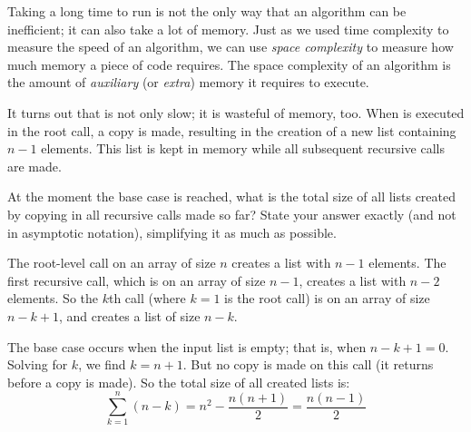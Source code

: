 \begin{prob}
\begin{subprobset}
\begin{subprob}
        \end{subprob}

        \begin{subprob}
            Taking a long time to run is not the only way that an algorithm can be inefficient;
            it can also take a lot of memory. Just as we used time complexity to measure the
            speed of an algorithm, we can use \emph{space complexity} to measure how much
            memory a piece of code requires.
            The space complexity of an algorithm is the amount of
            \emph{auxiliary} (or \emph{extra}) memory it requires to execute.

            It turns out that  is not only slow; it is wasteful
            of memory, too. When  is executed in the root call,
            a copy is made, resulting in the creation of a new list containing $n - 1$
            elements. This list is kept in memory while all subsequent recursive calls are made.

            At the moment the base case is reached, what is the total size of all lists
            created by copying in all recursive calls made so far?
            State your answer exactly (and not in asymptotic notation), simplifying
            it as much as possible.

            \begin{soln}
                The root-level call on an array of size $n$ creates a list with $n - 1$ elements. The first recursive call,
                which is on an array of size $n-1$, creates a list with $n - 2$ elements. So
                the $k$th call (where $k = 1$ is the root call) is on an array of size $n - k +1$, and creates
                a list of size $n - k$.

                The base case occurs when the input list is empty; that is, when $n - k + 1 = 0$. Solving for
                $k$, we find $k = n + 1$. But no copy is made on this call (it returns before a copy is made).
                So the total size of all created lists is:
                \[
                    \sum_{k=1}^{n} (n - k) = n^2 - \frac{n(n+1)}{2} = \frac{n(n-1)}{2}
                \]
            \end{soln}
        \end{subprob}

    \end{subprobset}
\end{prob}
